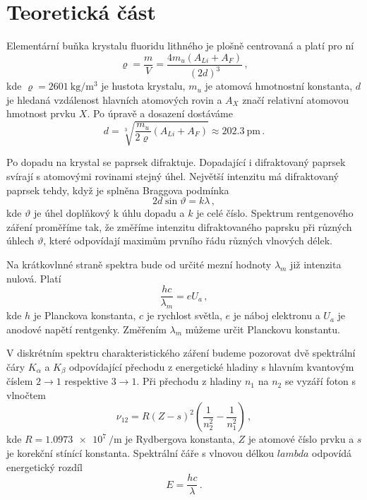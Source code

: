 \section*{Teoretická část}
Elementární buňka krystalu fluoridu lithného je plošně centrovaná a platí pro ní
\begin{equation}
\varrho = \frac{m}{V} = \frac{4m_u(A_{Li}+A_{F})}{(2d)^3} \,,
\end{equation}
kde $\varrho = \SI{2601}{\kg\per\metre\cubed}$ je hustota krystalu, $m_u$ je atomová hmotnostní konstanta, $d$ je hledaná vzdálenost hlavních atomových rovin a $A_X$ značí relativní atomovou hmotnost prvku $X$. Po úpravě a dosazení dostáváme
\begin{equation}
d=\sqrt[3]{\frac{m_u}{2\varrho}(A_{Li}+A_F)} \approx \SI{202.3}{\pico\metre} \,.
\end{equation}

Po dopadu na krystal se paprsek difraktuje. Dopadající i difraktovaný paprsek svírají s atomovými rovinami stejný úhel. Největší intenzitu má difraktovaný paprsek tehdy, když je splněna Braggova podmínka \cite{skripta}
\begin{equation}
\label{e:bragg}
2d \sin\vartheta = k\lambda \,,
\end{equation}
kde $\vartheta$ je úhel doplňkový k úhlu dopadu a $k$ je celé číslo.
Spektrum rentgenového záření proměříme tak, že změříme intenzitu difraktovaného paprsku při různých úhlech $\vartheta$, které odpovídají maximům prvního řádu různých vlnových délek.


Na krátkovlnné straně spektra bude od určité mezní hodnoty $\lambda_m$ již intenzita nulová. Platí \cite{skripta}
\begin{equation} \label{e:planck}
\frac{hc}{\lambda_m} = e U_a \,,
\end{equation}
kde $h$ je Planckova konstanta, $c$ je rychlost světla, $e$ je náboj elektronu a $U_a$ je anodové napětí rentgenky. Změřením $\lambda_m$ můžeme určit Planckovu konstantu.


V diskrétním spektru charakteristického záření budeme pozorovat dvě spektrální čáry $K_\alpha$ a $K_\beta$ odpovídající přechodu z energetické hladiny s hlavním kvantovým číslem $2 \to 1$ respektive $3 \to 1$.
Při přechodu z hladiny $n_1$ na $n_2$ se vyzáří foton s vlnočtem \cite{skripta}
\begin{equation} \label{e:cary}
\nu_{12}=R(Z-s)^2 \left( \frac{1}{n_2^2} - \frac{1}{n_1^2}  \right) \,,
\end{equation}
kde $R = \SI{1.0973e7}{\per\metre}$ je Rydbergova konstanta, $Z$ je atomové číslo prvku a $s$ je korekční stínící konstanta.
Spektrální čáře s vlnovou délkou $lambda$ odpovídá energetický rozdíl
\begin{equation}
E=\frac{hc}{\lambda} \,.
\end{equation}